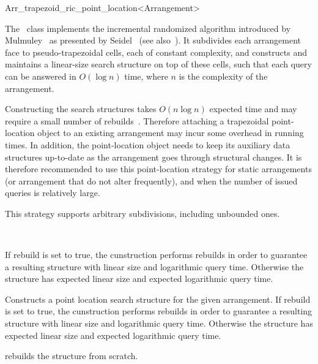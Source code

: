 
\ccRefPageBegin

\begin{ccRefClass}{Arr_trapezoid_ric_point_location<Arrangement>}
\label{arr_ref:trap_pl}

\ccDefinition

The \ccRefName\ class implements the incremental randomized algorithm
introduced by Mulmuley~\cite{m-fppa-90} as presented by
Seidel~\cite{s-sfira-91} (see also~\cite[Chapter~6]{bkos-cgaa-00}).
It subdivides each arrangement face to pseudo-trapezoidal cells, each
of constant complexity, and constructs and maintains a linear-size search
structure on top of these cells, such that each query can be answered
in $O(\log n)$ time, where $n$ is the complexity of the arrangement.

Constructing the search structures takes $O(n \log n)$ expected time 
and may require a small number of rebuilds~\cite{hkh-iiplgtds-12}. Therefore
attaching a trapezoidal point-location object to an existing arrangement
may incur some overhead in running times. In addition, the point-location
object needs to keep its auxiliary data structures up-to-date as the
arrangement goes through structural changes. It is therefore recommended
to use this point-location strategy for static arrangements (or arrangement
that do not alter frequently), and when the number of issued queries
is relatively large.

This strategy supports arbitrary subdivisions, including unbounded ones.


\ccIsModel
   \\

\ccCreation
{}

    {If rebuild is set to true, the cunstruction performs rebuilds in order to guarantee a resulting structure with linear size and logarithmic query time. 
Otherwise the structure has expected linear size and expected logarithmic query time.}

    {Constructs a point location search structure for the given arrangement. If rebuild is set to true, the cunstruction performs rebuilds in order to guarantee a resulting structure with linear size and logarithmic query time. Otherwise the structure has expected linear size and expected logarithmic query time.}

\ccModifiers

  {rebuilds the structure from scratch.}


\end{ccRefClass}

\ccRefPageEnd
